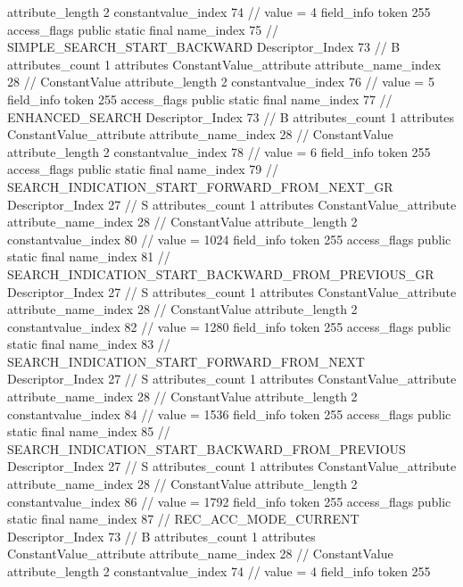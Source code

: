 {{{{{{{					attribute_length	2
					constantvalue_index	74		// value = 4
				}
				}
			}
			field_info {
				token	255
				access_flags	public static final
				name_index	75		// SIMPLE_SEARCH_START_BACKWARD
				Descriptor_Index	73		// B
				attributes_count	1
				attributes {
				ConstantValue_attribute {
					attribute_name_index	28		// ConstantValue
					attribute_length	2
					constantvalue_index	76		// value = 5
				}
				}
			}
			field_info {
				token	255
				access_flags	public static final
				name_index	77		// ENHANCED_SEARCH
				Descriptor_Index	73		// B
				attributes_count	1
				attributes {
				ConstantValue_attribute {
					attribute_name_index	28		// ConstantValue
					attribute_length	2
					constantvalue_index	78		// value = 6
				}
				}
			}
			field_info {
				token	255
				access_flags	public static final
				name_index	79		// SEARCH_INDICATION_START_FORWARD_FROM_NEXT_GR
				Descriptor_Index	27		// S
				attributes_count	1
				attributes {
				ConstantValue_attribute {
					attribute_name_index	28		// ConstantValue
					attribute_length	2
					constantvalue_index	80		// value = 1024
				}
				}
			}
			field_info {
				token	255
				access_flags	public static final
				name_index	81		// SEARCH_INDICATION_START_BACKWARD_FROM_PREVIOUS_GR
				Descriptor_Index	27		// S
				attributes_count	1
				attributes {
				ConstantValue_attribute {
					attribute_name_index	28		// ConstantValue
					attribute_length	2
					constantvalue_index	82		// value = 1280
				}
				}
			}
			field_info {
				token	255
				access_flags	public static final
				name_index	83		// SEARCH_INDICATION_START_FORWARD_FROM_NEXT
				Descriptor_Index	27		// S
				attributes_count	1
				attributes {
				ConstantValue_attribute {
					attribute_name_index	28		// ConstantValue
					attribute_length	2
					constantvalue_index	84		// value = 1536
				}
				}
			}
			field_info {
				token	255
				access_flags	public static final
				name_index	85		// SEARCH_INDICATION_START_BACKWARD_FROM_PREVIOUS
				Descriptor_Index	27		// S
				attributes_count	1
				attributes {
				ConstantValue_attribute {
					attribute_name_index	28		// ConstantValue
					attribute_length	2
					constantvalue_index	86		// value = 1792
				}
				}
			}
			field_info {
				token	255
				access_flags	public static final
				name_index	87		// REC_ACC_MODE_CURRENT
				Descriptor_Index	73		// B
				attributes_count	1
				attributes {
				ConstantValue_attribute {
					attribute_name_index	28		// ConstantValue
					attribute_length	2
					constantvalue_index	74		// value = 4
				}
				}
			}
			field_info {
				token	255
}}}}}
